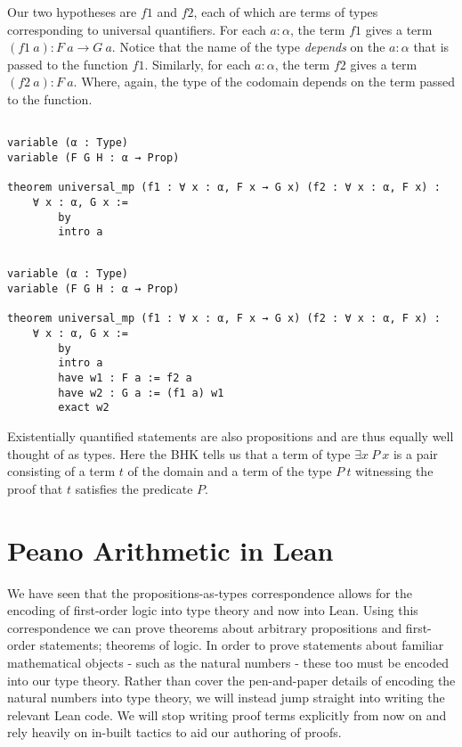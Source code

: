 \documentclass{book}
\begin{document}
Our two hypotheses are $f1$ and $f2$, each of which are terms of types corresponding to universal quantifiers. For each $a : \alpha$, the term $f1$ gives a term $(f1 \ a) : F \ a \to G \ a$. Notice that the name of the type \emph{depends} on the $a : \alpha$ that is passed to the function $f1$. Similarly, for each $a : \alpha$, the term $f2$ gives a term $(f2 \ a) : F \ a$. Where, again, the type of the codomain depends on the term passed to the function. 


\begin{center}
\begin{lstlisting}
                
variable (α : Type)
variable (F G H : α → Prop)

theorem universal_mp (f1 : ∀ x : α, F x → G x) (f2 : ∀ x : α, F x) :
    ∀ x : α, G x :=
        by
        intro a
\end{lstlisting}            
\end{center}




\begin{center}
\begin{lstlisting}
    
variable (α : Type)
variable (F G H : α → Prop)

theorem universal_mp (f1 : ∀ x : α, F x → G x) (f2 : ∀ x : α, F x) :
    ∀ x : α, G x :=
        by
        intro a
        have w1 : F a := f2 a
        have w2 : G a := (f1 a) w1
        exact w2
\end{lstlisting}            
\end{center}


Existentially quantified statements are also propositions and are thus equally well thought of as types. Here the BHK tells us that a term of type $\exists x \ P \ x$ is a pair consisting of a term $t$ of the domain and a term of the type $P \ t$ witnessing the proof that $t$ satisfies the predicate $P$. 

\newpage
\section{Peano Arithmetic in Lean}

We have seen that the propositions-as-types correspondence allows for the encoding of first-order logic into type theory and now into Lean. Using this correspondence we can prove theorems about arbitrary propositions and first-order statements; theorems of logic. In order to prove statements about familiar mathematical objects - such as the natural numbers - these too must be encoded into our type theory. Rather than cover the pen-and-paper details of encoding the natural numbers into type theory, we will instead jump straight into writing the relevant Lean code. We will stop writing proof terms explicitly from now on and rely heavily on in-built tactics to aid our authoring of proofs. 
\end{document}
